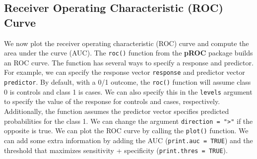 \documentclass[
  letterpaper,
]{krantz}
\makeatletter
\newenvironment{Shaded}{\begin{snugshade}}{\end{snugshade}}
\newcommand{\AttributeTok}[1]{\textcolor[rgb]{0.40,0.45,0.13}{#1}}
\newcommand{\ConstantTok}[1]{\textcolor[rgb]{0.56,0.35,0.01}{#1}}
\newcommand{\DecValTok}[1]{\textcolor[rgb]{0.68,0.00,0.00}{#1}}
\newcommand{\FunctionTok}[1]{\textcolor[rgb]{0.28,0.35,0.67}{#1}}
\newcommand{\NormalTok}[1]{\textcolor[rgb]{0.00,0.23,0.31}{#1}}
\newcommand{\OtherTok}[1]{\textcolor[rgb]{0.00,0.23,0.31}{#1}}
\newcommand{\SpecialCharTok}[1]{\textcolor[rgb]{0.37,0.37,0.37}{#1}}
\newcommand{\StringTok}[1]{\textcolor[rgb]{0.13,0.47,0.30}{#1}}
\newenvironment{kframe}{%
\medskip{}
\setlength{\fboxsep}{.8em}
 \def\at@end@of@kframe{}%
 \ifinner\ifhmode%
  \def\at@end@of@kframe{\end{minipage}}%
  \begin{minipage}{\columnwidth}%
 \fi\fi%
 \def\FrameCommand##1{\hskip\@totalleftmargin \hskip-\fboxsep
 \colorbox{shadecolor}{##1}\hskip-\fboxsep
     \hskip-\linewidth \hskip-\@totalleftmargin \hskip\columnwidth}%
 \MakeFramed {\advance\hsize-\width
   \@totalleftmargin\z@ \linewidth\hsize
   \@setminipage}}%
 {\par\unskip\endMakeFramed%
 \at@end@of@kframe}
\renewenvironment{Shaded}{\begin{kframe}}{\end{kframe}}
\makeatother
\begin{document}
\hypertarget{receiver-operating-characteristic-roc-curve}{%
\subsection{Receiver Operating Characteristic (ROC)
Curve}\label{receiver-operating-characteristic-roc-curve}}

We now plot the receiver operating characteristic (ROC) curve and
compute the area under the curve (AUC). The \texttt{roc()} function from
the \textbf{pROC} package builds an ROC curve. The function has several
ways to specify a response and predictor. For example, we can specify
the response vector \texttt{response} and predictor vector
\texttt{predictor}. By default, with a 0/1 outcome, the \texttt{roc()}
function will assume class 0 is controls and class 1 is cases. We can
also specify this in the \texttt{levels} argument to specify the value
of the response for controls and cases, respectively. Additionally, the
function assumes the predictor vector specifies predicted probabilities
for the class 1. We can change the argument
\texttt{direction\ =\ "\textgreater{}"} if the opposite is true. We can
plot the ROC curve by calling the \texttt{plot()} function. We can add
some extra information by adding the AUC (\texttt{print.auc\ =\ TRUE})
and the threshold that maximizes sensitivity + specificity
(\texttt{print.thres\ =\ TRUE}).

\begin{Shaded}
\end{Shaded}
\end{document}
